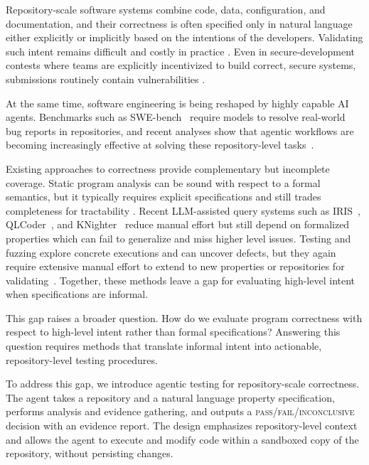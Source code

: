 \documentclass{article}
\theoremstyle{plain}
\theoremstyle{definition}
\theoremstyle{remark}
\begin{document}

Repository-scale software systems combine code, data, configuration, and documentation, and their correctness is often specified only in natural language either explicitly or implicitly based on the intentions of the developers.
Validating such intent remains difficult and costly in practice \citep{zeller2009why}.
Even in secure-development contests where teams are explicitly incentivized to build correct, secure systems, submissions routinely contain vulnerabilities \citep{ruef2016bibifi}.

At the same time, software engineering is being reshaped by highly capable AI agents.
Benchmarks such as SWE-bench~\citep{jimenez2024swebench} require models to resolve real-world bug reports in repositories, and recent analyses show that agentic workflows are becoming increasingly effective at solving these repository-level tasks~\citep{jimenez2024swebench,xia2024agentless,guo2025repoaudit}.

Existing approaches to correctness provide complementary but incomplete coverage.
Static program analysis can be sound with respect to a formal semantics, but it typically requires explicit specifications and still trades completeness for tractability \citep{cousot1979systematic, nielson1999principles}.
Recent LLM-assisted query systems such as IRIS~\citep{li2024iris}, QLCoder~\citep{wang2025qlcoder}, and KNighter~\citep{yang2025knighter} reduce manual effort but still depend on formalized properties which can fail to generalize and miss higher level issues.
Testing and fuzzing explore concrete executions and can uncover defects, but they again require extensive manual effort to extend to new properties or repositories for validating~\citep{manes2018fuzzing}.
Together, these methods leave a gap for evaluating high-level intent when specifications are informal.

This gap raises a broader question.
How do we evaluate program correctness with respect to high-level intent rather than formal specifications?
Answering this question requires methods that translate informal intent into actionable, repository-level testing procedures.

To address this gap, we introduce agentic testing for repository-scale correctness.
The agent takes a repository and a natural language property specification, performs analysis and evidence gathering, and outputs a \textsc{pass}/\textsc{fail}/\textsc{inconclusive} decision with an evidence report.
The design emphasizes repository-level context and allows the agent to execute and modify code within a sandboxed copy of the repository, without persisting changes.
\end{document}
